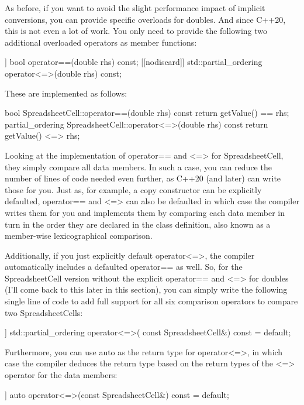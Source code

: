 As before, if you want to avoid the slight performance impact of implicit conversions, you can provide specific overloads for doubles. And since C++20, this is not even a lot of work. You only need to provide the following two additional overloaded operators as member functions:

\begin{cpp}
[[nodiscard]] bool operator==(double rhs) const;
[[nodiscard]] std::partial_ordering operator<=>(double rhs) const;
\end{cpp}

These are implemented as follows:

\begin{cpp}
bool SpreadsheetCell::operator==(double rhs) const
{
    return getValue() == rhs;
}
partial_ordering SpreadsheetCell::operator<=>(double rhs) const
{
    return getValue() <=> rhs;
}
\end{cpp}


Looking at the implementation of operator== and <=> for SpreadsheetCell, they simply compare all data members. In such a case, you can reduce the number of lines of code needed even further, as C++20 (and later) can write those for you. Just as, for example, a copy constructor can be explicitly defaulted, operator== and <=> can also be defaulted in which case the compiler writes them for you and implements them by comparing each data member in turn in the order they are declared in the class definition, also known as a member-wise lexicographical comparison.

Additionally, if you just explicitly default operator<=>, the compiler automatically includes a defaulted operator== as well. So, for the SpreadsheetCell version without the explicit operator== and <=> for doubles (I’ll come back to this later in this section), you can simply write the following single line of code to add full support for all six comparison operators to compare two SpreadsheetCells:

\begin{cpp}
[[nodiscard]] std::partial_ordering operator<=>(
    const SpreadsheetCell&) const = default;
\end{cpp}

Furthermore, you can use auto as the return type for operator<=>, in which case the compiler deduces the return type based on the return types of the <=> operator for the data members:

\begin{cpp}
[[nodiscard]] auto operator<=>(const SpreadsheetCell&) const = default;
\end{cpp}

